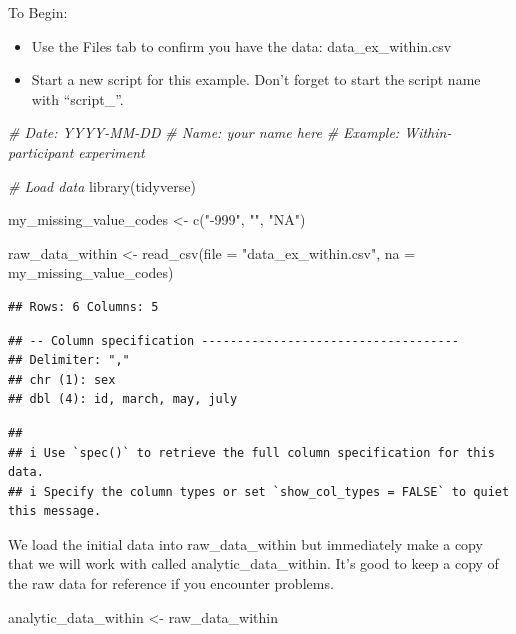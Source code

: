 \documentclass[
]{krantz}
\makeatletter
\newenvironment{Shaded}{\begin{snugshade}}{\end{snugshade}}
\newcommand{\AttributeTok}[1]{\textcolor[rgb]{0.61,0.61,0.61}{#1}}
\newcommand{\CommentTok}[1]{\textcolor[rgb]{0.37,0.37,0.37}{\textit{#1}}}
\newcommand{\FunctionTok}[1]{\textcolor[rgb]{0,0,0}{#1}}
\newcommand{\NormalTok}[1]{#1}
\newcommand{\OtherTok}[1]{\textcolor[rgb]{0.37,0.37,0.37}{#1}}
\newcommand{\StringTok}[1]{\textcolor[rgb]{0.5,0.5,0.5}{#1}}
\newenvironment{kframe}{%
\medskip{}
\setlength{\fboxsep}{.8em}
 \def\at@end@of@kframe{}%
 \ifinner\ifhmode%
  \def\at@end@of@kframe{\end{minipage}}%
  \begin{minipage}{\columnwidth}%
 \fi\fi%
 \def\FrameCommand##1{\hskip\@totalleftmargin \hskip-\fboxsep
 \colorbox{shadecolor}{##1}\hskip-\fboxsep
     \hskip-\linewidth \hskip-\@totalleftmargin \hskip\columnwidth}%
 \MakeFramed {\advance\hsize-\width
   \@totalleftmargin\z@ \linewidth\hsize
   \@setminipage}}%
 {\par\unskip\endMakeFramed%
 \at@end@of@kframe}
\renewenvironment{Shaded}{\begin{kframe}}{\end{kframe}}
\makeatother
\begin{document}
To Begin:

\begin{itemize}
\item
  Use the Files tab to confirm you have the data: data\_ex\_within.csv
\item
  Start a new script for this example. Don't forget to start the script name with ``script\_''.
\end{itemize}

\begin{Shaded}
\begin{Highlighting}[]
\CommentTok{\# Date: YYYY{-}MM{-}DD}
\CommentTok{\# Name: your name here}
\CommentTok{\# Example: Within{-}participant experiment}

\CommentTok{\# Load data}
\FunctionTok{library}\NormalTok{(tidyverse)}

\NormalTok{my\_missing\_value\_codes }\OtherTok{\textless{}{-}} \FunctionTok{c}\NormalTok{(}\StringTok{"{-}999"}\NormalTok{, }\StringTok{""}\NormalTok{, }\StringTok{"NA"}\NormalTok{)}

\NormalTok{raw\_data\_within }\OtherTok{\textless{}{-}} \FunctionTok{read\_csv}\NormalTok{(}\AttributeTok{file =} \StringTok{"data\_ex\_within.csv"}\NormalTok{,}
                     \AttributeTok{na =}\NormalTok{ my\_missing\_value\_codes)}
\end{Highlighting}
\end{Shaded}

\begin{verbatim}
## Rows: 6 Columns: 5
\end{verbatim}

\begin{verbatim}
## -- Column specification ------------------------------------
## Delimiter: ","
## chr (1): sex
## dbl (4): id, march, may, july
\end{verbatim}

\begin{verbatim}
## 
## i Use `spec()` to retrieve the full column specification for this data.
## i Specify the column types or set `show_col_types = FALSE` to quiet this message.
\end{verbatim}

We load the initial data into raw\_data\_within but immediately make a copy that we will work with called analytic\_data\_within. It's good to keep a copy of the raw data for reference if you encounter problems.

\begin{Shaded}
\begin{Highlighting}[]
\NormalTok{analytic\_data\_within }\OtherTok{\textless{}{-}}\NormalTok{ raw\_data\_within}
\end{Highlighting}
\end{Shaded}
\end{document}
